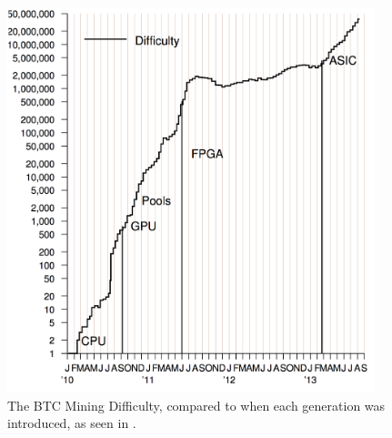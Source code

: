\begin{figure}[htb]
    \centering
    \includegraphics[width=0.95\textwidth]{Figures/Bitcoin/Difficulty-devices}
    \caption{The BTC Mining Difficulty, compared to when each generation was introduced, as seen in \cite{bespoke-silicon}.}
    \label{fig:bitcoin-difficulty-devices}
\end{figure}


%

